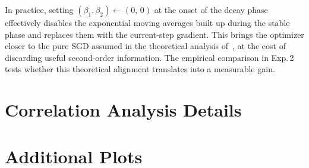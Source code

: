 \documentclass[10pt,conference,compsocconf]{IEEEtran}
\begin{document}
In practice, setting $(\beta_1, \beta_2) \leftarrow (0,\,0)$ at the onset of
the decay phase effectively disables the exponential moving averages built up
during the stable phase and replaces them with the current-step gradient.
This brings the optimizer closer to the pure SGD assumed in the theoretical
analysis of~\citet{wen2024river}, at the cost of discarding useful second-order
information. The empirical comparison in Exp.\,2 tests whether this theoretical
alignment translates into a measurable gain.

\section{Correlation Analysis Details}
\label{app:correlations}


\section{Additional Plots}
\label{app:extra-plots}

\end{document}
